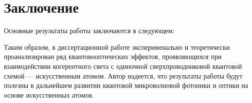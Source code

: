 \chapter*{Заключение}						%


Основные результаты работы заключаются в следующем:

Таким образом, в диссертационной работе эксперименально и теоретически проанализирован ряд квантовооптических эффектов, проявляющихся при взаимодействии когерентного света с одиночной сверхпроводниковой квантовой схемой --- искусственным атомом. Автор надеется, что результаты работы будут полезны в дальнейшем развитии квантовой микроволновой фотоники и оптики на основе искусственных атомов.

